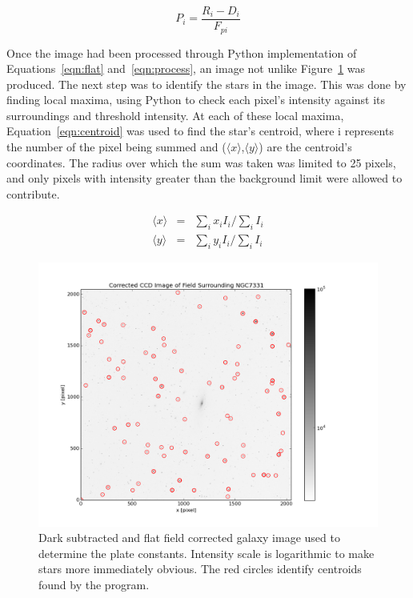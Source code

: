 \documentclass[a4paper,12pt]{article}
\begin{document}
\begin{equation}
P_{i} = \frac{R_{i} - D_{i}}{F_{pi}}
\label{eqn:process}
\end{equation}

Once the image had been processed through Python implementation of Equations~\ref{eqn:flat} and~\ref{eqn:process}, an image not unlike Figure~\ref{fig:galaxy} was produced. The next step was to identify the stars in the image. This was done by finding local maxima, using Python to check each pixel's intensity against its surroundings and threshold intensity. At each of these local maxima, Equation~\ref{eqn:centroid} was used to find the star's centroid, where i represents the number of the pixel being summed and ($\langle x \rangle$,$\langle y \rangle$) are the centroid's coordinates. The radius over which the sum was taken was limited to 25 pixels, and only pixels with intensity greater than the background limit were allowed to contribute.

\begin{equation}
\begin{array}{ccl}
\langle x \rangle &=& \sum_{i}x_{i}I_{i}/\sum_{i}I_{i}\\
\langle y \rangle &=& \sum_{i}y_{i}I_{i}/\sum_{i}I_{i}
\end{array}
\label{eqn:centroid}
\end{equation}

\begin{figure}[!htbp]
\centering
\includegraphics[width = \linewidth]{NGC7331.png}
\caption{Dark subtracted and flat field corrected galaxy image used to determine the plate constants. Intensity scale is logarithmic to make stars more immediately obvious. The red circles identify centroids found by the program.}
\label{fig:galaxy}
\end{figure}
\end{document}
